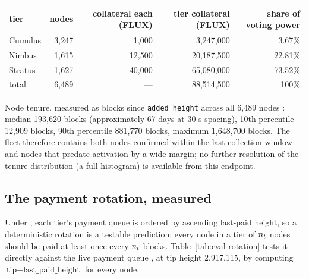 \begin{table}[H]
\centering
\small
\begin{tabular}{lrrrr}
\toprule
tier & nodes & collateral each (FLUX) & tier collateral (FLUX) & share of voting power \\
\midrule
Cumulus & 3,247 & 1,000 & 3,247,000 & 3.67\% \\
Nimbus & 1,615 & 12,500 & 20,187,500 & 22.81\% \\
Stratus & 1,627 & 40,000 & 65,080,000 & 73.52\% \\
\midrule
total & 6,489 & --- & 88,514,500 & 100\% \\
\bottomrule
\end{tabular}
\label{tab:eval-fleet}
\end{table}

Node tenure, measured as blocks since \texttt{added\_height} across all 6,489 nodes
\shipped {}: median 193,620 blocks
(approximately 67 days at 30 s spacing), 10th percentile 12,909 blocks, 90th percentile 881,770
blocks, maximum 1,648,700 blocks. The fleet therefore contains both nodes confirmed within the
last collection window and nodes that predate \PoN activation by a wide margin; no further
resolution of the tenure distribution (a full histogram) is available from this endpoint.

\subsection{The payment rotation, measured}
\label{sec:eval-rotation}

Under \PoN, each tier's payment queue is ordered by ascending last-paid height, so a
deterministic rotation is a testable prediction: every node in a tier of $n_{t}$ nodes should
be paid at least once every $n_{t}$ blocks. Table~\ref{tab:eval-rotation} tests it directly
against the live payment queue \shipped {},
at tip height 2,917,115, by computing $\text{tip} - \text{last\_paid\_height}$ for every node.

